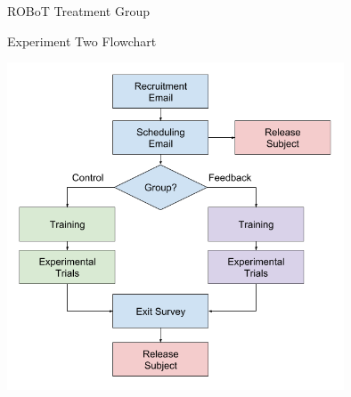\documentclass[10pt]{beamer}
\begin{document}
\begin{frame}[fragile]{ROBoT Treatment Group}
\begin{figure}
  \begin{center}


  \end{center}
\end{figure}
\end{frame}

\begin{frame}[fragile]{Experiment Two Flowchart}
  \begin{center}
    \includegraphics[width=0.75\textwidth]{../img/robot_flow.png}
  \end{center}
\end{frame}
\end{document}
